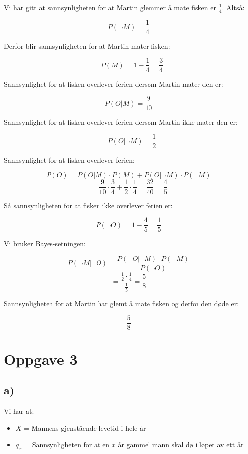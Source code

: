 \documentclass[a4paper, 12pt]{article}
\begin{document}
\begin{FlushLeft}
Vi har gitt at sannsynligheten for at Martin glemmer å mate fisken er \( \frac{1}{4} \). Altså: 
\end{FlushLeft}
\[
P(\neg M) = \frac{1}{4}
\]
\begin{FlushLeft}
Derfor blir sannsynligheten for at Martin mater fisken:
\end{FlushLeft}
\[
\quad P(M) = 1 - \frac{1}{4} = \frac{3}{4}
\]
\begin{FlushLeft}
Sannsynlighet for at fisken overlever ferien dersom Martin mater den er:
\end{FlushLeft}
\[
P(O|M) = \frac{9}{10}
\]
\begin{FlushLeft}
Sannsynlighet for at fisken overlever ferien dersom Martin ikke mater den er:
\end{FlushLeft}
\[
\quad P(O|\neg M) = \frac{1}{2}
\]
\begin{FlushLeft}
Sannsynlighet for at fisken overlever ferien:
\end{FlushLeft}
\[
P(O) = P(O|M) \cdot P(M) + P(O|\neg M) \cdot P(\neg M)
\]
\[
= \frac{9}{10} \cdot \frac{3}{4} + \frac{1}{2} \cdot \frac{1}{4} = \frac{32}{40} = \frac{4}{5}
\]
\begin{FlushLeft}
Så sannsynligheten for at fisken ikke overlever ferien er:
\end{FlushLeft}
\[
P(\neg O) = 1 - \frac{4}{5} = \frac{1}{5}
\]
\begin{FlushLeft}
Vi bruker Bayes-setningen:
\end{FlushLeft}
\[
P(\neg M|\neg O) = \frac{P(\neg O|\neg M) \cdot P(\neg M)}{P(\neg O)}
\]
\[
= \frac{\frac{1}{2} \cdot \frac{1}{4}}{\frac{1}{5}} = \frac{5}{8}
\]
\begin{FlushLeft}
Sannsynligheten for at Martin har glemt å mate fisken og derfor den døde er:
\end{FlushLeft}
\[
\frac{5}{8}
\]

\section*{Oppgave 3}
\subsection*{a)}
Vi har at:
\begin{itemize}
    \item \(X\) = Mannens gjenstående levetid i hele år
    \item \(q_x\) = Sannsynligheten for at en \(x\) år gammel mann skal dø i løpet av ett år
\end{itemize}
\end{document}
